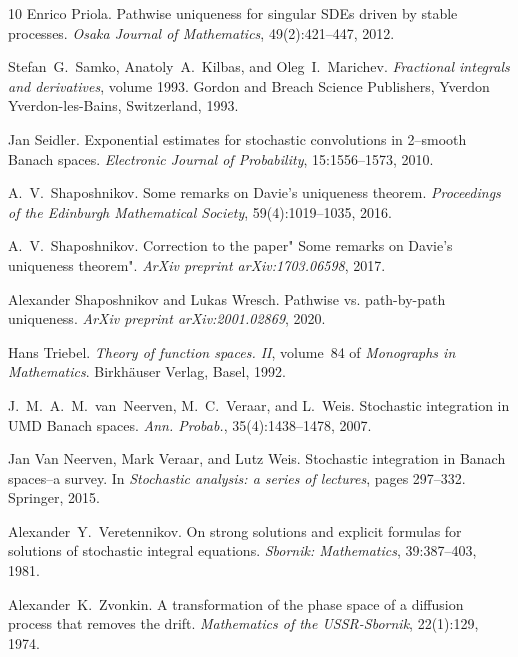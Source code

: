 \documentclass[10pt]{article}
\newcommand{\tmtextit}[1]{{\itshape{#1}}}
\begin{document}
\begin{thebibliography}{10}
  Enrico Priola. {\newblock}Pathwise uniqueness for
  singular SDEs driven by stable processes. {\newblock}\tmtextit{Osaka Journal
  of Mathematics}, 49(2):421--447, 2012.{\newblock}
  
  Stefan~G.~Samko, Anatoly~A.~Kilbas, and 
  Oleg~I.~Marichev. {\newblock}\tmtextit{Fractional integrals and
  derivatives},  volume  1993. {\newblock}Gordon and Breach Science
  Publishers, Yverdon Yverdon-les-Bains, Switzerland, 1993.{\newblock}
  
  Jan Seidler. {\newblock}Exponential estimates for
  stochastic convolutions in 2--smooth Banach spaces.
  {\newblock}\tmtextit{Electronic Journal of Probability}, 15:1556--1573,
  2010.{\newblock}
  
  A.~V.~Shaposhnikov. {\newblock}Some remarks on
  Davie's uniqueness theorem. {\newblock}\tmtextit{Proceedings of the
  Edinburgh Mathematical Society}, 59(4):1019--1035, 2016.{\newblock}
  
  A.~V.~Shaposhnikov. {\newblock}Correction to the
  paper" Some remarks on Davie's uniqueness theorem".
  {\newblock}\tmtextit{ArXiv preprint arXiv:1703.06598}, 2017.{\newblock}
  
  Alexander Shaposhnikov  and  Lukas Wresch.
  {\newblock}Pathwise vs. path-by-path uniqueness. {\newblock}\tmtextit{ArXiv
  preprint arXiv:2001.02869}, 2020.{\newblock}
  
  Hans Triebel. {\newblock}\tmtextit{Theory of function
  spaces. II},  volume~84  of \tmtextit{Monographs in Mathematics}.
  {\newblock}Birkh{\"a}user Verlag, Basel, 1992.{\newblock}
  
  J.~M.~A.~M.~van~Neerven, M.~C.~Veraar, and 
  L.~Weis. {\newblock}Stochastic integration in UMD Banach spaces.
  {\newblock}\tmtextit{Ann. Probab.}, 35(4):1438--1478, 2007.{\newblock}
  
  Jan Van Neerven, Mark Veraar, and  Lutz Weis.
  {\newblock}Stochastic integration in Banach spaces--a survey. {\newblock}In
  \tmtextit{Stochastic analysis: a series of lectures},  pages  297--332.
  Springer, 2015.{\newblock}
  
  Alexander~Y.~Veretennikov. {\newblock}On strong
  solutions and explicit formulas for solutions of stochastic integral
  equations. {\newblock}\tmtextit{Sbornik: Mathematics}, 39:387--403,
  1981.{\newblock}
  
  Alexander~K.~Zvonkin. {\newblock}A transformation of
  the phase space of a diffusion process that removes the drift.
  {\newblock}\tmtextit{Mathematics of the USSR-Sbornik}, 22(1):129,
  1974.{\newblock}
\end{thebibliography}

\
\end{document}
